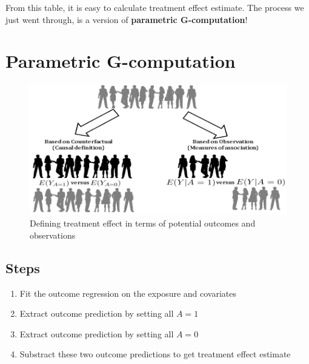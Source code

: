 \documentclass[
]{book}
\providecommand{\tightlist}{%
  \setlength{\itemsep}{0pt}\setlength{\parskip}{0pt}}
\begin{document}
From this table, it is easy to calculate treatment effect estimate. The process we just went through, is a version of \textbf{parametric G-computation}!

\hypertarget{parametric-g-computation}{%
\section{Parametric G-computation}\label{parametric-g-computation}}

\begin{figure}
\includegraphics[width=0.7\linewidth]{images/gcomp} \caption{Defining treatment effect in terms of potential outcomes and observations}\label{fig:gcomppic}
\end{figure}

\hypertarget{steps}{%
\subsection{Steps}\label{steps}}

\begin{enumerate}
\def\labelenumi{\arabic{enumi}.}
\tightlist
\item
  Fit the outcome regression on the exposure and covariates
\item
  Extract outcome prediction by setting all \(A=1\)
\item
  Extract outcome prediction by setting all \(A=0\)
\item
  Substract these two outcome predictions to get treatment effect estimate
\end{enumerate}
\end{document}
